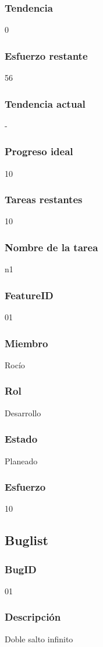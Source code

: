 \subsubsection{Tendencia}
0
\subsubsection{Esfuerzo restante}
56
\subsubsection{Tendencia actual}
-
\subsubsection{Progreso ideal}
10
\subsubsection{Tareas restantes}
10
\subsubsection{Nombre de la tarea}
n1
\subsubsection{FeatureID}
01
\subsubsection{Miembro}
Rocío
\subsubsection{Rol}
Desarrollo
\subsubsection{Estado}
Planeado
\subsubsection{Esfuerzo}
10
\subsection{Buglist}
\subsubsection{BugID}
01
\subsubsection{Descripción}
Doble salto infinito
